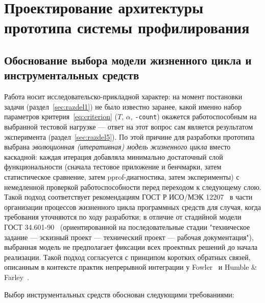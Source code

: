\section{Проектирование архитектуры прототипа системы профилирования}
\label{sec:razdel3}

\subsection{Обоснование выбора модели жизненного цикла и инструментальных средств}
\label{sec:3.1}

Работа носит исследовательско-прикладной характер: на момент постановки
задачи (раздел~\ref{sec:razdel1}) не было известно заранее, какой именно
набор параметров критерия~\eqref{eq:criterion} ($T$, $\alpha$,
\texttt{-count}) окажется работоспособным на выбранной тестовой нагрузке —
ответ на этот вопрос сам является результатом эксперимента
(раздел~\ref{sec:razdel5}). По этой причине для разработки прототипа
выбрана \emph{эволюционная (итеративная) модель жизненного цикла} вместо
каскадной: каждая итерация добавляла минимально достаточный слой
функциональности (сначала тестовое приложение и бенчмарки, затем
статистическое сравнение, затем pprof-диагностика, затем эксперименты) с
немедленной проверкой работоспособности перед переходом к следующему
слою. Такой подход соответствует рекомендациям ГОСТ Р ИСО/МЭК
12207~\cite{gost12207} в части организации процессов жизненного цикла
программных средств для случая, когда требования уточняются по ходу
разработки; в отличие от стадийной модели ГОСТ 34.601-90~\cite{gost34601}
(ориентированной на последовательные стадии "техническое задание — эскизный
проект — технический проект — рабочая документация"), выбранная модель не
предполагает фиксации всех проектных решений до начала реализации. Такой
подход согласуется с принципом коротких обратных связей, описанным в
контексте практик непрерывной интеграции у Fowler~\cite{fowler-ci} и
Humble \& Farley~\cite{humble-farley2010}.

Выбор инструментальных средств обоснован следующими требованиями:

